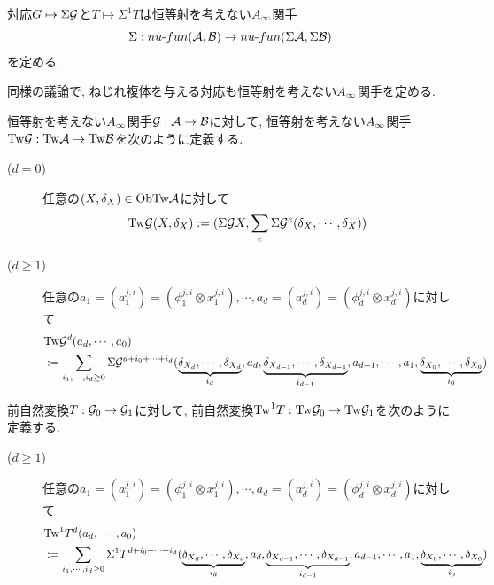 \documentclass[uplatex, a4paper, 14Q, dvipdfmx]{jsarticle}
\begin{document}
\begin{lemma}
  対応$G \mapsto \Sigma\mathcal{G}$と$T \mapsto \Sigma^1T$は恒等射を考えない$A_{\infty}$関手 
  \begin{align*}
    \Sigma : nu \text{-} fun (\mathcal{A}, \mathcal{B}) \to nu \text{-} fun (\Sigma\mathcal{A}, \Sigma\mathcal{B})
  \end{align*}
  を定める. 
\end{lemma}

同様の議論で, ねじれ複体を与える対応も恒等射を考えない$A_{\infty}$関手を定める.

\begin{definition}
  恒等射を考えない$A_{\infty}$関手$\mathcal{G} : \mathcal{A} \to \mathcal{B}$に対して, 恒等射を考えない$A_{\infty}$関手$\mathrm{Tw}\mathcal{G} : \mathrm{Tw}\mathcal{A} \to \mathrm{Tw}\mathcal{B}$を次のように定義する. 
  \begin{description}
    \item[($d=0$)] 任意の$(X,\delta_X) \in \mathrm{Ob}\mathrm{Tw}\mathcal{A}$に対して
    \begin{align*}
      \mathrm{Tw}\mathcal{G} (X,\delta_X) 
      := (\Sigma\mathcal{G} X, \sum_{e} \Sigma\mathcal{G}^e(\delta_X,\cdots,\delta_X))
    \end{align*}
    \item[($d \geq 1$)] 任意の$a_1 = (a_1^{j,i}) = (\phi_1^{j,i} \otimes x_1^{j,i}), \cdots, a_d = (a_d^{j,i}) = (\phi_d^{j,i} \otimes x_d^{j,i})$に対して
    \begin{align*}
      &\mathrm{Tw}\mathcal{G}^d (a_d,\cdots,a_0) \\
      &:= \sum_{i_1,\cdots,i_d \geq 0} \Sigma\mathcal{G}^{d+i_0+\cdots+i_d} (
        \underbrace{\delta_{X_d},\cdots,\delta_{X_d}}_{i_d}, a_d, 
        \underbrace{\delta_{X_{d-1}},\cdots,\delta_{X_{d-1}}}_{i_{d-1}}, a_{d-1}, 
        \cdots, a_1, 
        \underbrace{\delta_{X_0},\cdots,\delta_{X_0}}_{i_0})
    \end{align*}
  \end{description}
\end{definition}

\begin{definition}[前自然変換$\Tw^1T$]
  前自然変換$T : \mathcal{G}_0 \to \mathcal{G}_1$に対して, 前自然変換$\mathrm{Tw}^1T : \mathrm{Tw}\mathcal{G}_0 \to \mathrm{Tw}\mathcal{G}_1$を次のように定義する.
  \begin{description}
    \item[($d \geq 1$)] 任意の$a_1 = (a_1^{j,i}) = (\phi_1^{j,i} \otimes x_1^{j,i}), \cdots, a_d = (a_d^{j,i}) = (\phi_d^{j,i} \otimes x_d^{j,i})$に対して
    \begin{align*}
      &\mathrm{Tw}^1T^d (a_d,\cdots,a_0) \\
      &:= \sum_{i_1,\cdots,i_d \geq 0} \Sigma^1T^{d+i_0+\cdots+i_d} (
        \underbrace{\delta_{X_d},\cdots,\delta_{X_d}}_{i_d}, a_d, 
        \underbrace{\delta_{X_{d-1}},\cdots,\delta_{X_{d-1}}}_{i_{d-1}}, a_{d-1}, 
        \cdots, a_1, 
        \underbrace{\delta_{X_0},\cdots,\delta_{X_0}}_{i_0})
    \end{align*}
  \end{description}
\end{definition}
\end{document}
